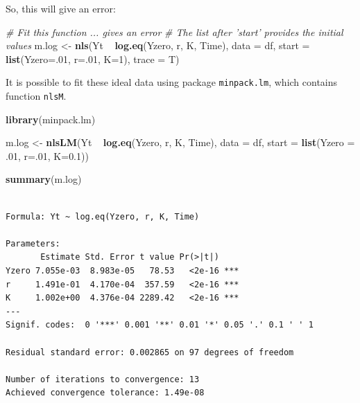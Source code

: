 \documentclass[]{book}
\newenvironment{Shaded}{\begin{snugshade}}{\end{snugshade}}
\newcommand{\KeywordTok}[1]{\textcolor[rgb]{0.13,0.29,0.53}{\textbf{{#1}}}}
\newcommand{\DataTypeTok}[1]{\textcolor[rgb]{0.13,0.29,0.53}{{#1}}}
\newcommand{\DecValTok}[1]{\textcolor[rgb]{0.00,0.00,0.81}{{#1}}}
\newcommand{\FloatTok}[1]{\textcolor[rgb]{0.00,0.00,0.81}{{#1}}}
\newcommand{\StringTok}[1]{\textcolor[rgb]{0.31,0.60,0.02}{{#1}}}
\newcommand{\CommentTok}[1]{\textcolor[rgb]{0.56,0.35,0.01}{\textit{{#1}}}}
\newcommand{\NormalTok}[1]{{#1}}
\begin{document}
So, this will give an error:

\begin{Shaded}
\begin{Highlighting}[]
\CommentTok{# Fit this function ... gives an error}
\CommentTok{# The list after 'start' provides the initial values}
\NormalTok{m.log <-}\StringTok{ }\KeywordTok{nls}\NormalTok{(Yt ~}\StringTok{ }\KeywordTok{log.eq}\NormalTok{(Yzero, r, K, Time), }\DataTypeTok{data =} \NormalTok{df, }\DataTypeTok{start =} \KeywordTok{list}\NormalTok{(}\DataTypeTok{Yzero=}\NormalTok{.}\DecValTok{01}\NormalTok{, }\DataTypeTok{r=}\NormalTok{.}\DecValTok{01}\NormalTok{, }\DataTypeTok{K=}\DecValTok{1}\NormalTok{), }\DataTypeTok{trace =} \NormalTok{T)}
\end{Highlighting}
\end{Shaded}

It is possible to fit these ideal data using package
\texttt{minpack.lm}, which contains function \texttt{nlsM}.

\begin{Shaded}
\begin{Highlighting}[]
\KeywordTok{library}\NormalTok{(minpack.lm)}

\NormalTok{m.log <-}\StringTok{ }\KeywordTok{nlsLM}\NormalTok{(Yt ~}\StringTok{ }\KeywordTok{log.eq}\NormalTok{(Yzero, r, K, Time), }\DataTypeTok{data =} \NormalTok{df, }\DataTypeTok{start =} \KeywordTok{list}\NormalTok{(}\DataTypeTok{Yzero =} \NormalTok{.}\DecValTok{01}\NormalTok{, }\DataTypeTok{r=}\NormalTok{.}\DecValTok{01}\NormalTok{, }\DataTypeTok{K=}\FloatTok{0.1}\NormalTok{))}

\KeywordTok{summary}\NormalTok{(m.log)}
\end{Highlighting}
\end{Shaded}

\begin{verbatim}

Formula: Yt ~ log.eq(Yzero, r, K, Time)

Parameters:
       Estimate Std. Error t value Pr(>|t|)    
Yzero 7.055e-03  8.983e-05   78.53   <2e-16 ***
r     1.491e-01  4.170e-04  357.59   <2e-16 ***
K     1.002e+00  4.376e-04 2289.42   <2e-16 ***
---
Signif. codes:  0 '***' 0.001 '**' 0.01 '*' 0.05 '.' 0.1 ' ' 1

Residual standard error: 0.002865 on 97 degrees of freedom

Number of iterations to convergence: 13 
Achieved convergence tolerance: 1.49e-08
\end{verbatim}
\end{document}
